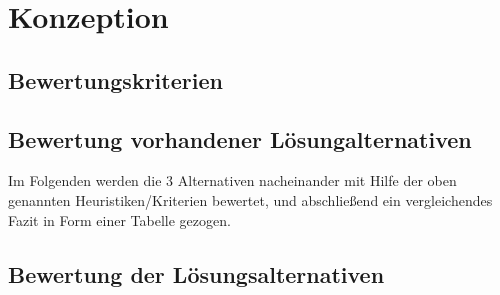 \chapter{Konzeption}

\section{Bewertungskriterien}
 
\section{Bewertung vorhandener Lösungalternativen}

Im Folgenden werden die 3 Alternativen nacheinander mit Hilfe der oben genannten Heuristiken/Kriterien bewertet, und abschließend ein vergleichendes Fazit in Form einer Tabelle  gezogen.

\section{Bewertung der Lösungsalternativen}


